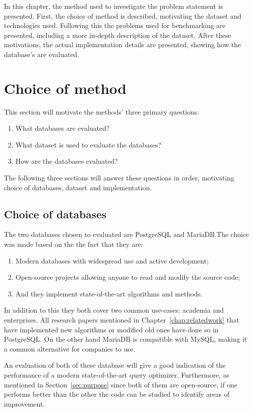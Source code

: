 In this chapter, the method used to investigate the problem statement is
presented. First, the choice of method is described, motivating the dataset and
technologies used. Following this the problems used for benchmarking are
presented, including a more in-depth description of the dataset. After these
motivations, the actual implementation details are presented, showing how the
database's are evaluated.

\section{Choice of method}\label{sec:choiceofmethod}
This section will motivate the methods' three primary questions:
\begin{enumerate}
\item What databases are evaluated?
\item What dataset is used to evaluate the databases?
\item How are the databases evaluated?
\end{enumerate}

The following three sections will answer these questions in order, motivating
choice of databases, dataset and implementation.

\subsection{Choice of databases}\label{sec:choiceofdatabases}
The two databases chosen to evaluated are PostgreSQL and MariaDB.\@ The choice was
made based on the the fact that they are:
\begin{enumerate}
\item Modern databases with widespread use and active development;
\item Open-source projects allowing anyone to read and modify the source code;
\item And they implement state-of-the-art algorithms and methods.
\end{enumerate}

In addition to this they both cover two common use-cases: academia and
enterprises. All research papers mentioned in Chapter~\ref{chap:relatedwork} that have
implemented new algorithms or modified old ones have done so in PostgreSQL.\@
On the other hand MariaDB is compatible with MySQL, making it a common
alternative for companies to use.

An evaluation of both of these database will give a good indication of the
performance of a modern state-of-the-art query optimizer. Furthermore, as
mentioned in Section~\ref{sec:purpose} since both of them are open-source, if
one performs better than the other the code can be studied to identify areas of
improvement.

